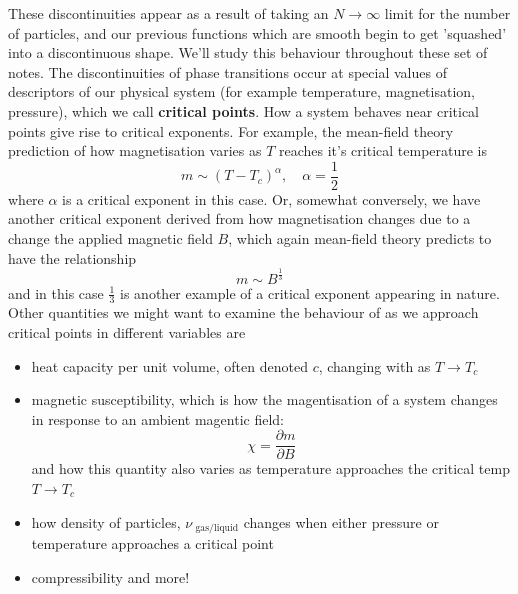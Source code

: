 These discontinuities appear as a result of taking an $N \rightarrow \infty$ limit for the number of particles, and our previous functions which are smooth begin to get 'squashed' into a discontinuous shape. We'll study this behaviour throughout these set of notes. The discontinuities of phase transitions occur at special values of descriptors of our physical system (for example temperature, magnetisation, pressure), which we call \textbf{critical points}. How a system behaves near critical points give rise to critical exponents. For example, the mean-field theory prediction of how magnetisation varies as $T$ reaches it's critical temperature is \[ 
m \sim (T - T_c)^\alpha,\quad \alpha = \frac{ 1}{2} \] 
where $\alpha$ is a critical exponent in this case. Or, somewhat conversely, we have another critical exponent derived from how magnetisation changes due to a change the applied magnetic field $B$, which again mean-field theory predicts to have the relationship \[ m \sim B^{ \frac{ 1}{3}} \] and in this case $\frac{ 1}{ 3}$ is another example of a critical exponent appearing in nature. 
Other quantities we might want to examine the behaviour of as we approach critical points in different variables are 
\begin{itemize} 
	\item heat capacity per unit volume, often denoted $c$, changing with as $T \rightarrow T_c $
	\item magnetic susceptibility, which is how the magentisation of a system changes in response to an ambient magentic field: \[ \chi = \frac{ \partial m}{ \partial B } \] and how this quantity also varies as temperature approaches the critical temp $T \rightarrow T_c$
	\item how density of particles, $\nu_{ \text{ gas} / \text{liquid}}$ changes when either pressure or temperature approaches a critical point 
	\item compressibility and more! 
\end{itemize}  
 
